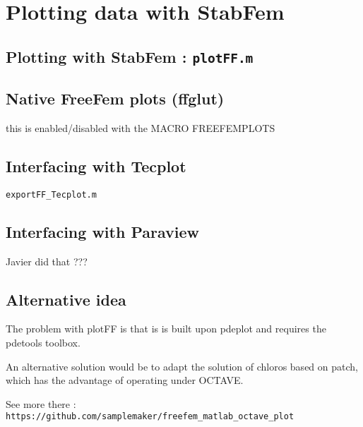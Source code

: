 

\chapter{Plotting data with StabFem}

\section{Plotting with StabFem : \texttt{plotFF.m}}

\section{Native FreeFem plots (ffglut)}

this is enabled/disabled with the MACRO FREEFEMPLOTS 

\section{Interfacing with Tecplot}


\texttt{exportFF\_Tecplot.m}

\section{Interfacing with Paraview}

Javier did that ???

\section{Alternative idea}

The problem with plotFF is that is is built upon pdeplot and requires the pdetools toolbox.

An alternative solution would be to adapt the solution of chloros based on patch, which has the advantage of operating under OCTAVE.

See more there :  \verb| https://github.com/samplemaker/freefem_matlab_octave_plot  |
